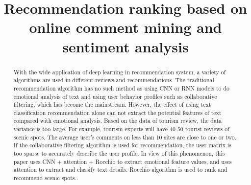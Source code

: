 \documentclass[conference]{IEEEtran}
\begin{document}
\title{Recommendation ranking based on online comment mining and sentiment analysis
}
\author{
\and
{}
\and
{}
\and
{}

}

\maketitle

\begin{abstract}
    With the wide application of deep learning in recommendation system, a variety of algorithms are used in different reviews and recommendations. The traditional recommendation algorithm has no such method as using CNN or RNN models to do emotional analysis of text and using user behavior profiles such as collaborative filtering, which has become the mainstream. However, the effect of using text classification recommendation alone can not extract the potential features of text compared with emotional analysis. Based on the data of tourism review, the data variance is too large. For example, tourism experts will have 40-50 tourist reviews of scenic spots. The average user's comments on less than 10 sites are close to one or two. If the collaborative filtering algorithm is used for recommendation, the user matrix is too sparse to accurately describe the user profile. In view of this phenomenon, this paper uses CNN + attention + Rocchio to extract emotional feature values, and uses attention to extract and classify text details. Rocchio algorithm is used to rank and recommend scenic spots..
\end{abstract}
\end{document}
